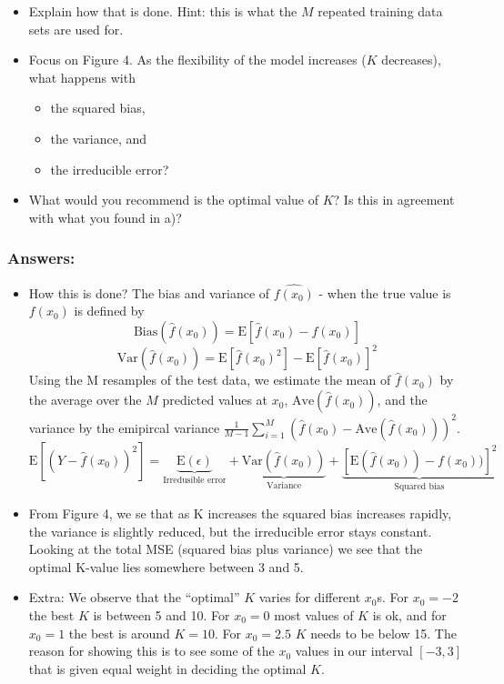 \documentclass[]{article}
\providecommand{\tightlist}{%
  \setlength{\itemsep}{0pt}\setlength{\parskip}{0pt}}
\begin{document}
\begin{itemize}
\tightlist
\item
  Explain how that is done. Hint: this is what the \(M\) repeated
  training data sets are used for.
\item
  Focus on Figure 4. As the flexibility of the model increases (\(K\)
  decreases), what happens with

  \begin{itemize}
  \tightlist
  \item
    the squared bias,\\
  \item
    the variance, and\\
  \item
    the irreducible error?
  \end{itemize}
\item
  What would you recommend is the optimal value of \(K\)? Is this in
  agreement with what you found in a)?
\end{itemize}

\subsubsection{Answers:}\label{answers-2}

\begin{itemize}
\item
  {How this is done? The bias and variance of \(\hat{f(x_0)}\) - when
  the true value is \(f(x_0)\) is defined by \[
  \text{Bias}(\hat f(x_0)) =\text{E}[\hat f(x_0) - f(x_0)]
  \] \[
  \text{Var}(\hat f(x_0)) = \text{E}[\hat f(x_0)^2] - \text{E}[\hat f(x_0)]^2
  \] Using the M resamples of the test data, we estimate the mean of
  \(\hat f(x_0)\) by the average over the \(M\) predicted values at
  \(x_0\), \(\text{Ave}(\hat{f}(x_0))\), and the variance by the
  emipircal variance
  \(\frac{1}{M-1} \sum_{i=1}^M (\hat{f}(x_0)-\text{Ave}(\hat{f}(x_0)))^2\).}
  \[
  \text{E}\left[\left(Y-\hat{f}\left(x_0\right)\right)^2\right]=\underbrace{\text{E}(\epsilon)}_{\text{Irredusible error}}+\underbrace{\text{Var}\left(\hat{f}\left(x_0\right)\right)}_{\text{Variance}}+\underbrace{\left[\text{E}\left(\hat{f}\left(x_0\right)\right)-f(x_0))\right]^2}_{\text{Squared bias}}
  \]
\item
  { From Figure 4, we se that as K increases the squared bias increases
  rapidly, the variance is slightly reduced, but the irreducible error
  stays constant. Looking at the total MSE (squared bias plus variance)
  we see that the optimal K-value lies somewhere between 3 and 5.}
\item
  { Extra: We observe that the ``optimal'' \(K\) varies for different
  \(x_0\)s. For \(x_0=-2\) the best \(K\) is between 5 and 10. For
  \(x_0=0\) most values of \(K\) is ok, and for \(x_0=1\) the best is
  around \(K=10\). For \(x_0=2.5\) \(K\) needs to be below 15. The
  reason for showing this is to see some of the \(x_0\) values in our
  interval \([-3,3]\) that is given equal weight in deciding the optimal
  \(K\).}
\end{itemize}
\end{document}
